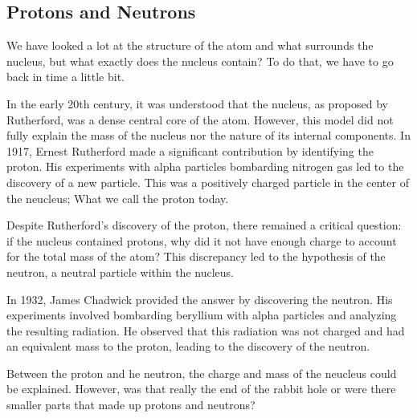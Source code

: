 \subsection{Protons and Neutrons}

We have looked a lot at the structure of the atom and what surrounds the nucleus, but what exactly does the nucleus contain?
To do that, we have to go back in time a little bit.

In the early 20th century, it was understood that the nucleus, as proposed by Rutherford, was a dense central core of the atom.
However, this model did not fully explain the mass of the nucleus nor the nature of its internal components.
In 1917, Ernest Rutherford made a significant contribution by identifying the proton.
His experiments with alpha particles bombarding nitrogen gas led to the discovery of a new particle.
This was a positively charged particle in the center of the neucleus; What we call the proton today.

Despite Rutherford's discovery of the proton, there remained a critical question: if the nucleus contained protons, why did it not have enough charge to account for the total mass of the atom? This discrepancy led to the hypothesis of the neutron, a neutral particle within the nucleus.

In 1932, James Chadwick provided the answer by discovering the neutron.
His experiments involved bombarding beryllium with alpha particles and analyzing the resulting radiation.
He observed that this radiation was not charged and had an equivalent mass to the proton, leading to the discovery of the neutron.

Between the proton and he neutron, the charge and mass of the neucleus could be explained.
However, was that really the end of the rabbit hole or were there smaller parts that made up protons and neutrons?




